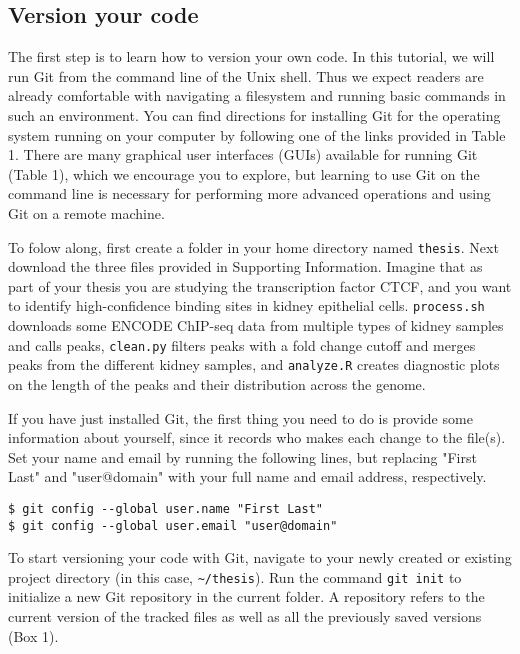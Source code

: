 \subsection{Version your code}

The first step is to learn how to version your own code.
In this tutorial, we will run Git from the command line of the Unix shell.
Thus we expect readers are already comfortable with navigating a filesystem and running basic commands in such an environment.
You can find directions for installing Git for the operating system running on your computer by following one of the links provided in Table 1.
There are many graphical user interfaces (GUIs) available for running Git (Table 1), which we encourage you to explore, but learning to use Git on the command line is necessary for performing more advanced operations and using Git on a remote machine.

To folow along, first create a folder in your home directory named \verb|thesis|.
Next download the three files provided in Supporting Information.
Imagine that as part of your thesis you are studying the transcription factor CTCF, and you want to identify high-confidence binding sites in kidney epithelial cells.
\verb|process.sh| downloads some ENCODE ChIP-seq data from multiple types of kidney samples and calls peaks,
\verb|clean.py| filters peaks with a fold change cutoff and merges peaks from the different kidney samples,
and \verb|analyze.R| creates diagnostic plots on the length of the peaks and their distribution across the genome.

If you have just installed Git, the first thing you need to do is provide some information about yourself, since it records who makes each change to the file(s).
Set your name and email by running the following lines, but replacing "First Last" and "user@domain" with your full name and email address, respectively.

\begin{lstlisting}
$ git config --global user.name "First Last"
$ git config --global user.email "user@domain"
\end{lstlisting}

To start versioning your code with Git, navigate to your newly created or existing project directory (in this case, \verb|~/thesis|).
Run the command \verb|git init| to initialize a new Git repository in the current folder.
A repository refers to the current version of the tracked files as well as all the previously saved versions (Box 1).

